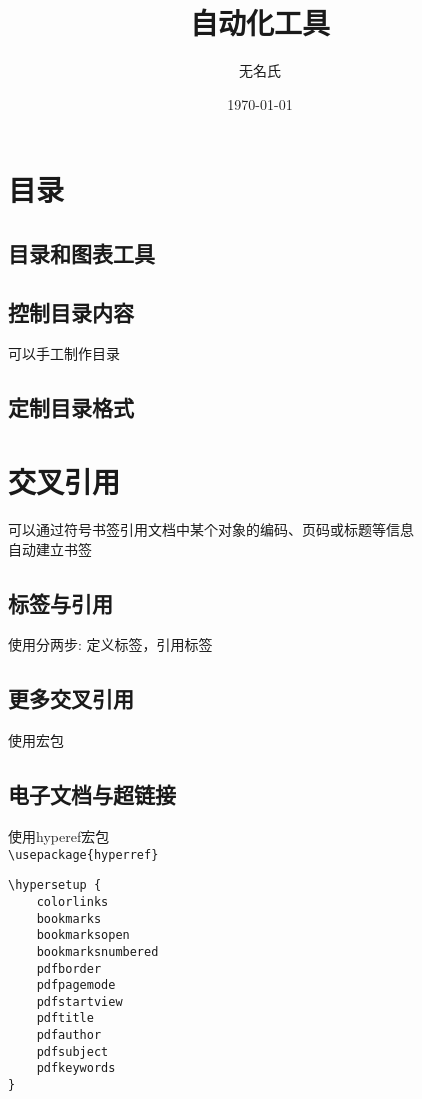 \documentclass[a4paper, titlepage, hyperref, UTF8]{article}	%
\title{自动化工具}
\author{无名氏}
\date{\today}
\begin{document}
\maketitle
\tableofcontents
\section{目录}
\subsection{目录和图表工具}

\subsection{控制目录内容}
可以手工制作目录

\subsection{定制目录格式}



\section{交叉引用}
可以通过符号书签引用文档中某个对象的编码、页码或标题等信息\\
自动建立书签


\subsection{标签与引用}
使用分两步: 定义标签，引用标签



\subsection{更多交叉引用}
使用宏包
\subsection{电子文档与超链接}
使用hyperef宏包\\
\verb|\usepackage{hyperref}|
\begin{verbatim}
\hypersetup {
    colorlinks
    bookmarks
    bookmarksopen
    bookmarksnumbered
    pdfborder
    pdfpagemode
    pdfstartview
    pdftitle
    pdfauthor
    pdfsubject
    pdfkeywords
}
\end{verbatim}
\end{document}
